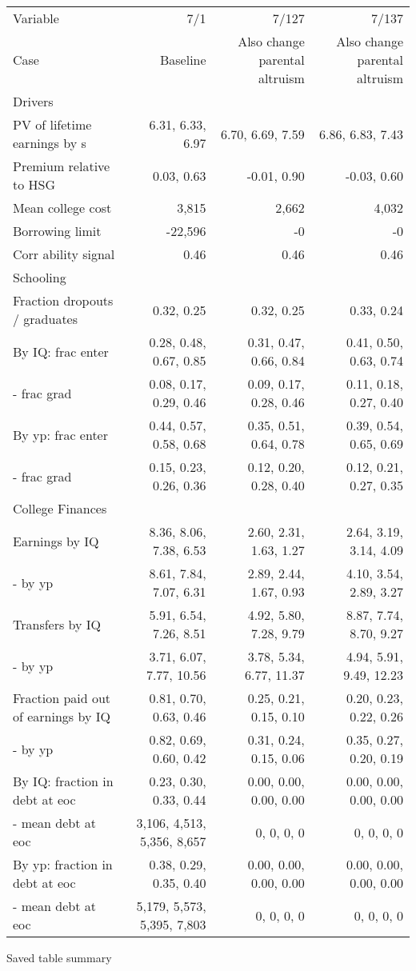\begin{tabular}{lrrr}
\hline
Variable & 7/1  & 7/127  & 7/137  \\
Case & Baseline  & Also change parental altruism  & Also change parental altruism  \\
Drivers &   &   &   \\
PV of lifetime earnings by s & 6.31, 6.33, 6.97  & 6.70, 6.69, 7.59  & 6.86, 6.83, 7.43  \\
Premium relative to HSG & 0.03, 0.63  & -0.01, 0.90  & -0.03, 0.60  \\
Mean college cost & 3,815  & 2,662  & 4,032  \\
Borrowing limit & -22,596  & -0  & -0  \\
Corr ability signal & 0.46  & 0.46  & 0.46  \\
\hline
Schooling &   &   &   \\
Fraction dropouts / graduates & 0.32, 0.25  & 0.32, 0.25  & 0.33, 0.24  \\
By IQ: frac enter & 0.28, 0.48, 0.67, 0.85  & 0.31, 0.47, 0.66, 0.84  & 0.41, 0.50, 0.63, 0.74  \\
- frac grad & 0.08, 0.17, 0.29, 0.46  & 0.09, 0.17, 0.28, 0.46  & 0.11, 0.18, 0.27, 0.40  \\
By yp: frac enter & 0.44, 0.57, 0.58, 0.68  & 0.35, 0.51, 0.64, 0.78  & 0.39, 0.54, 0.65, 0.69  \\
- frac grad & 0.15, 0.23, 0.26, 0.36  & 0.12, 0.20, 0.28, 0.40  & 0.12, 0.21, 0.27, 0.35  \\
\hline
College Finances &   &   &   \\
Earnings by IQ & 8.36, 8.06, 7.38, 6.53  & 2.60, 2.31, 1.63, 1.27  & 2.64, 3.19, 3.14, 4.09  \\
- by yp & 8.61, 7.84, 7.07, 6.31  & 2.89, 2.44, 1.67, 0.93  & 4.10, 3.54, 2.89, 3.27  \\
Transfers by IQ & 5.91, 6.54, 7.26, 8.51  & 4.92, 5.80, 7.28, 9.79  & 8.87, 7.74, 8.70, 9.27  \\
- by yp & 3.71, 6.07, 7.77, 10.56  & 3.78, 5.34, 6.77, 11.37  & 4.94, 5.91, 9.49, 12.23  \\
Fraction paid out of earnings by IQ & 0.81, 0.70, 0.63, 0.46  & 0.25, 0.21, 0.15, 0.10  & 0.20, 0.23, 0.22, 0.26  \\
- by yp & 0.82, 0.69, 0.60, 0.42  & 0.31, 0.24, 0.15, 0.06  & 0.35, 0.27, 0.20, 0.19  \\
By IQ: fraction in debt at eoc & 0.23, 0.30, 0.33, 0.44  & 0.00, 0.00, 0.00, 0.00  & 0.00, 0.00, 0.00, 0.00  \\
- mean debt at eoc & 3,106, 4,513, 5,356, 8,657  & 0, 0, 0, 0  & 0, 0, 0, 0  \\
By yp: fraction in debt at eoc & 0.38, 0.29, 0.35, 0.40  & 0.00, 0.00, 0.00, 0.00  & 0.00, 0.00, 0.00, 0.00  \\
- mean debt at eoc & 5,179, 5,573, 5,395, 7,803  & 0, 0, 0, 0  & 0, 0, 0, 0  \\
\hline
\end{tabular}%
Saved table summary

